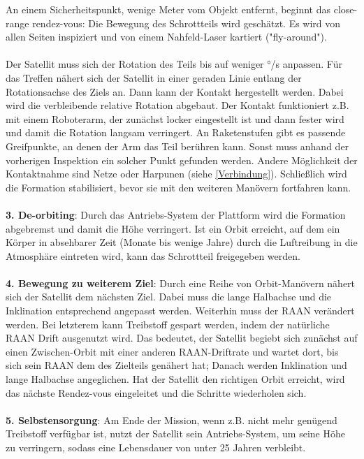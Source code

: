 \documentclass{article}
\begin{document}
\noindent An einem Sicherheitspunkt, wenige Meter vom Objekt entfernt, beginnt das close-range rendez-vous: Die Bewegung des Schrottteils wird geschätzt. Es wird von allen Seiten inspiziert und von einem Nahfeld-Laser kartiert ("fly-around"). \\\\
Der Satellit muss sich der Rotation des Teils bis auf weniger °/s anpassen. Für das Treffen nähert sich der Satellit in einer geraden Linie entlang der Rotationsachse des Ziels an. Dann kann der Kontakt hergestellt werden. Dabei wird die verbleibende relative Rotation abgebaut. Der Kontakt funktioniert z.B. mit einem Roboterarm, der zunächst locker eingestellt ist und dann fester wird und damit die Rotation langsam verringert. An Raketenstufen gibt es passende Greifpunkte, an denen der Arm das Teil berühren kann. Sonst muss anhand der vorherigen Inspektion ein solcher Punkt gefunden werden. Andere Möglichkeit der Kontaktnahme sind Netze oder Harpunen (siehe \autoref{Verbindung}). Schließlich wird die Formation stabilisiert, bevor sie mit den weiteren Manövern fortfahren kann. \\\\
\textbf{3. De-orbiting}: Durch das Antriebs-System der Plattform wird die Formation abgebremst und damit die Höhe verringert. Ist ein Orbit erreicht, auf dem ein Körper in absehbarer Zeit (Monate bis wenige Jahre) durch die Luftreibung in die Atmosphäre eintreten wird, kann das Schrottteil freigegeben werden. \\\\
\textbf{4. Bewegung zu weiterem Ziel}: Durch eine Reihe von Orbit-Manövern nähert sich der Satellit dem nächsten Ziel. Dabei muss die lange Halbachse und die Inklination entsprechend angepasst werden. Weiterhin muss der RAAN verändert werden. Bei letzterem kann Treibstoff gespart werden, indem der natürliche RAAN Drift ausgenutzt wird. Das bedeutet, der Satellit begiebt sich zunächst auf einen Zwischen-Orbit mit einer anderen RAAN-Driftrate und wartet dort, bis sich sein RAAN dem des Zielteils genähert hat; Danach werden Inklination und lange Halbachse angeglichen. Hat der Satellit den richtigen Orbit erreicht, wird das nächste Rendez-vous eingeleitet und die Schritte wiederholen sich. \\\\
\textbf{5. Selbstensorgung}: Am Ende der Mission, wenn z.B. nicht mehr genügend Treibstoff verfügbar ist, nutzt der Satellit sein Antriebs-System, um seine Höhe zu verringern, sodass eine Lebensdauer von unter 25 Jahren verbleibt. \\\\
\end{document}
